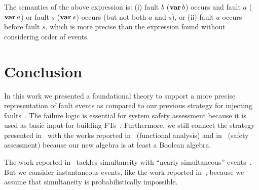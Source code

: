 \documentclass[en,twoside,onehalfspacing,phd]{risethesis}
\newcommand{\simulink}{Simulink\xspace}
\def\varop{\ensuremath\operatorname{\mathbf{var}}}
\newcommand{\var}[1]{\ensuremath\varop #1}
\begin{document}
The semantics of the above expression is: (i) fault $b$ ($\var{b}$) occurs and fault $a$ ($\var{a}$) or fault $s$ ($\var{s}$) occurs (but not both $a$ and $s$), or (ii) fault $a$ occurs before fault $s$, which is more precise than the expression found without considering order of events.

\chapter{Conclusion}
\label{sec:conclusion}

In this work we presented a foundational theory to support a more precise representation of fault events as compared to our previous strategy for injecting faults~\cite{DM2012}.
%
The failure logic is essential for system safety assessment because it is used as basic input for building \aclp{FT}~\cite{PMS+2001,JMS+2011,GMS+2010}.
%
%
Furthermore, we still connect the strategy presented in~\cite{MJG+2010} with the works reported in~\cite{JMS+2011} (functional analysis) and in~\cite{GMS+2010,PMS+2001} (safety assessment) because our new algebra is at least a Boolean algebra.


%
%

\begin{sloppypar}
The work reported in~\cite{Walker2009,WP2009,WP2010} tackles simultaneity with ``nearly simultaneous'' events~\cite{EWG2013}.
But we consider instantaneous events, like the work reported in~\cite{MRL2014}, because we assume that simultaneity is probabilistically impossible.
\end{sloppypar}

%
%
%
%
\end{document}
